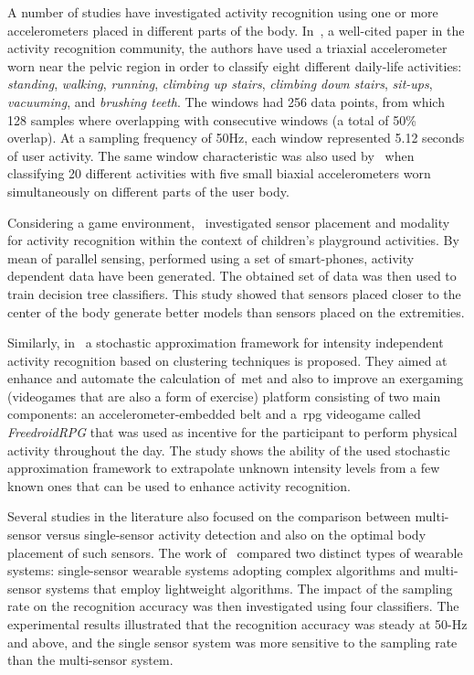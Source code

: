A number of studies have investigated activity recognition using one or more accelerometers placed in different parts of the body. In~\cite{ravi_activity_2005}, a well-cited paper in the activity recognition community, the authors have used a triaxial accelerometer worn near the pelvic region in order to classify eight different daily-life activities: \textit{standing}, \textit{walking}, \textit{running}, \textit{climbing up stairs}, \textit{climbing down stairs}, \textit{sit-ups}, \textit{vacuuming}, and \textit{brushing teeth}. The windows had 256 data points, from which 128 samples where overlapping with consecutive windows (a total of 50\% overlap). At a sampling frequency of 50Hz, each window represented 5.12 seconds of user activity. The same window characteristic was also used by~\cite{bao_activity_2004} when classifying 20 different activities with five small biaxial accelerometers worn simultaneously on different parts of the user body.

Considering a game environment,~\cite{jablonsky_evaluating_2017} investigated sensor placement and modality for activity recognition within the context of children's playground  activities. By mean of parallel sensing, performed using a set of smart-phones, activity dependent data have been generated. The obtained set of data was then used to train decision tree classifiers. This study showed that sensors placed closer to the center of the body generate better models than sensors placed on the extremities. 

Similarly, in~\cite{alshurafa_designing_2014} a stochastic approximation framework for intensity independent activity recognition based on clustering techniques is proposed. They aimed at enhance and automate the calculation of~\gls{met} and also to improve an exergaming (videogames that are also a form of exercise) platform consisting of two main components: an accelerometer-embedded belt and a~\gls{rpg} videogame called \textit{FreedroidRPG} that was used as incentive for the participant to perform physical activity throughout the day. The study shows the ability of the used stochastic approximation framework to extrapolate unknown intensity levels from a few known ones that can be used to enhance activity recognition.

Several studies in the literature also focused on the comparison between multi-sensor versus single-sensor activity detection and also on the optimal body placement of such sensors. The work of~\cite{gao_evaluation_2014} compared two distinct types of wearable systems: single-sensor wearable systems adopting complex algorithms and multi-sensor systems that employ lightweight algorithms. The impact of the sampling rate on the recognition accuracy was then investigated using four classifiers. The experimental results illustrated that the recognition accuracy was steady at 50-Hz and above, and the single sensor system was more sensitive to the sampling rate than the multi-sensor system.

